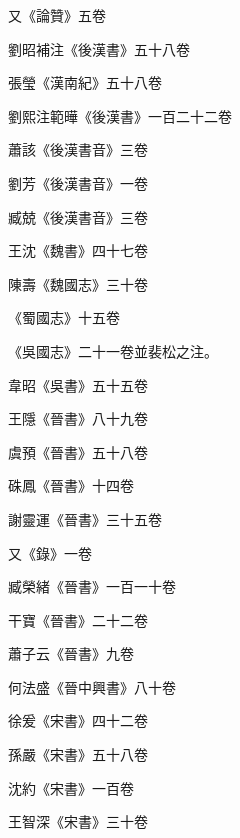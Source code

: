 \begin{pinyinscope}
 又《論贊》五卷



 劉昭補注《後漢書》五十八卷



 張瑩《漢南紀》五十八卷



 劉熙注範曄《後漢書》一百二十二卷



 蕭該《後漢書音》三卷



 劉芳《後漢書音》一卷



 臧兢《後漢書音》三卷



 王沈《魏書》四十七卷



 陳壽《魏國志》三十卷



 《蜀國志》十五卷



 《吳國志》二十一卷並裴松之注。



 韋昭《吳書》五十五卷



 王隱《晉書》八十九卷



 虞預《晉書》五十八卷



 硃鳳《晉書》十四卷



 謝靈運《晉書》三十五卷



 又《錄》一卷



 臧榮緒《晉書》一百一十卷



 干寶《晉書》二十二卷



 蕭子云《晉書》九卷



 何法盛《晉中興書》八十卷



 徐爰《宋書》四十二卷



 孫嚴《宋書》五十八卷



 沈約《宋書》一百卷



 王智深《宋書》三十卷




\end{pinyinscope}
